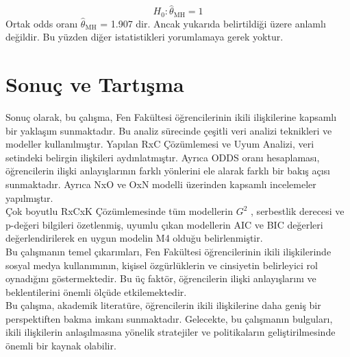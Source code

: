 \documentclass{article}
\begin{document}
$$H_0: \hat{\theta}_{\text{MH}} = 1$$
Ortak odds oranı $\hat{\theta}_{\text{MH}}$ = 1.907 dir. Ancak yukarıda belirtildiği üzere anlamlı değildir. Bu yüzden diğer istatistikleri yorumlamaya gerek yoktur.

\section{Sonuç ve Tartışma}
Sonuç olarak, bu çalışma, Fen Fakültesi öğrencilerinin ikili ilişkilerine kapsamlı bir yaklaşım sunmaktadır. Bu analiz sürecinde çeşitli veri analizi teknikleri ve modeller kullanılmıştır. Yapılan RxC Çözümlemesi ve Uyum Analizi, veri setindeki belirgin ilişkileri aydınlatmıştır. Ayrıca ODDS oranı hesaplaması, öğrencilerin ilişki anlayışlarının farklı yönlerini ele alarak farklı bir bakış açısı sunmaktadır. Ayrıca NxO ve OxN modelli üzerinden kapsamlı incelemeler yapılmıştır.\\
Çok boyutlu RxCxK Çözümlemesinde tüm modellerin $G^2$ , serbestlik derecesi ve p-değeri bilgileri özetlenmiş, uyumlu çıkan modellerin AIC ve BIC değerleri değerlendirilerek en uygun modelin M4 olduğu belirlenmiştir.\\
Bu çalışmanın temel çıkarımları, Fen Fakültesi öğrencilerinin ikili ilişkilerinde sosyal medya kullanımının, kişisel özgürlüklerin ve cinsiyetin belirleyici rol oynadığını göstermektedir. Bu üç faktör, öğrencilerin ilişki anlayışlarını ve beklentilerini önemli ölçüde etkilemektedir.\\
Bu çalışma, akademik literatüre, öğrencilerin ikili ilişkilerine daha geniş bir perspektiften bakma imkanı sunmaktadır. Gelecekte, bu çalışmanın bulguları, ikili ilişkilerin anlaşılmasına yönelik stratejiler ve politikaların geliştirilmesinde önemli bir kaynak olabilir.

\clearpage
\end{document}
